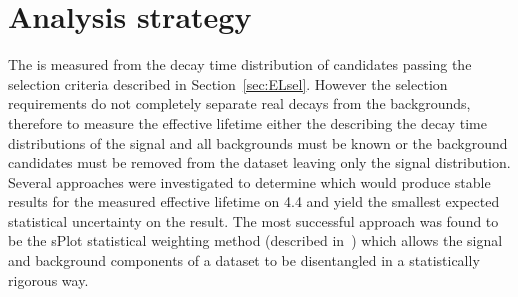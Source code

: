 \section{Analysis strategy}
\label{sec:fitstrategy}


The \bsmumu \el is measured from the decay time distribution of \bsmumu candidates passing the selection criteria described in Section~\ref{sec:ELsel}. However the selection requirements do not completely separate real \bsmumu decays from the backgrounds, therefore to measure the \bsmumu effective lifetime either the \pdfs describing the decay time distributions of the signal and all backgrounds must be known or the background candidates must be removed from the dataset leaving only the signal distribution. Several approaches were investigated to determine which would produce stable results for the measured \bsmumu effective lifetime on 4.4 \fb and yield the smallest expected statistical uncertainty on the result. The most successful approach was found to be the sPlot statistical weighting method (described in~\cite{Pivk:2004ty}) which allows the signal and background components of a dataset to be disentangled in a statistically rigorous way. %

